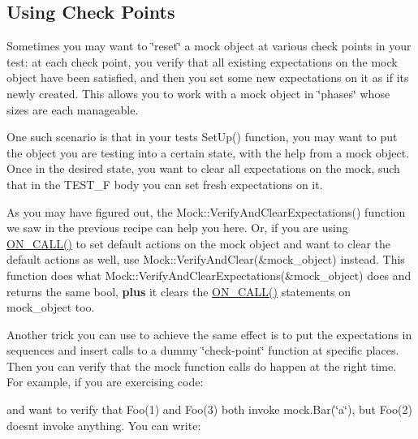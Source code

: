 \subsection*{Using Check Points}

Sometimes you may want to \char`\"{}reset\char`\"{} a mock object at various check points in your test\+: at each check point, you verify that all existing expectations on the mock object have been satisfied, and then you set some new expectations on it as if it\textquotesingle{}s newly created. This allows you to work with a mock object in \char`\"{}phases\char`\"{} whose sizes are each manageable.

One such scenario is that in your test\textquotesingle{}s {\ttfamily Set\+Up()} function, you may want to put the object you are testing into a certain state, with the help from a mock object. Once in the desired state, you want to clear all expectations on the mock, such that in the {\ttfamily T\+E\+S\+T\+\_\+F} body you can set fresh expectations on it.

As you may have figured out, the {\ttfamily Mock\+::\+Verify\+And\+Clear\+Expectations()} function we saw in the previous recipe can help you here. Or, if you are using {\ttfamily \mbox{\hyperlink{googletest-master_2googlemock_2include_2gmock_2gmock-spec-builders_8h_a5b12ae6cf84f0a544ca811b380c37334}{O\+N\+\_\+\+C\+A\+L\+L()}}} to set default actions on the mock object and want to clear the default actions as well, use {\ttfamily Mock\+::\+Verify\+And\+Clear(\&mock\+\_\+object)} instead. This function does what {\ttfamily Mock\+::\+Verify\+And\+Clear\+Expectations(\&mock\+\_\+object)} does and returns the same {\ttfamily bool}, {\bfseries{plus}} it clears the {\ttfamily \mbox{\hyperlink{googletest-master_2googlemock_2include_2gmock_2gmock-spec-builders_8h_a5b12ae6cf84f0a544ca811b380c37334}{O\+N\+\_\+\+C\+A\+L\+L()}}} statements on {\ttfamily mock\+\_\+object} too.

Another trick you can use to achieve the same effect is to put the expectations in sequences and insert calls to a dummy \char`\"{}check-\/point\char`\"{} function at specific places. Then you can verify that the mock function calls do happen at the right time. For example, if you are exercising code\+:


\begin{DoxyCode}{0}
\end{DoxyCode}


and want to verify that {\ttfamily Foo(1)} and {\ttfamily Foo(3)} both invoke {\ttfamily mock.\+Bar(\char`\"{}a\char`\"{})}, but {\ttfamily Foo(2)} doesn\textquotesingle{}t invoke anything. You can write\+:


